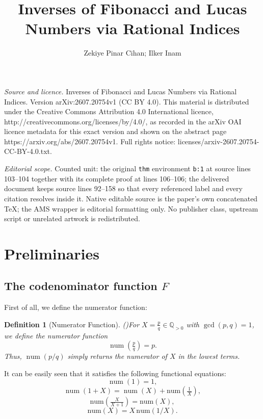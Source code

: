 \documentclass[10pt,a4paper]{amsart}
\numberwithin{equation}{section}
\numberwithin{table}{section}
\numberwithin{figure}{section}
\DeclareMathOperator{\num}{num}
\newtheorem{definition}[thm]{Definition}
\begin{document}
\title[Inverses of Fibonacci and Lucas Numbers via Rational Indices]{Inverses of Fibonacci and Lucas Numbers via Rational Indices}
\author{Zekiye Pinar Cihan; Ilker Inam}
\date{}
\maketitle
\noindent\emph{Source and licence.} Inverses of Fibonacci and Lucas Numbers via Rational Indices. Version arXiv:2607.20754v1 (CC BY 4.0). This material is distributed under the Creative Commons Attribution 4.0 International licence, http://creativecommons.org/licenses/by/4.0/, as recorded in the arXiv OAI licence metadata for this exact version and shown on the abstract page https://arxiv.org/abs/2607.20754v1. Full rights notice: licenses/arxiv-2607.20754-CC-BY-4.0.txt.\par\smallskip
\noindent\textit{Editorial scope.} Counted unit: the original \texttt{thm} environment \texttt{b:1} at source lines 103--104 together with its complete proof at lines 106--106; the delivered document keeps source lines 92--158 so that every referenced label and every citation resolves inside it. Native editable source is the paper's own concatenated TeX; the AMS wrapper is editorial formatting only. No publisher class, upstream script or unrelated artwork is redistributed.
\section{Preliminaries}\label{sec:1}\subsection{The codenominator function $F$}First of all, we define the numerator function:
\begin{definition}[Numerator Function] {\normalfont(\cite{ULUDAG2022103192})}For $X = \tfrac{p}{q}\in\mathbb{Q}_{>0}$ with $\gcd (p, q) = 1$, we define the \emph{numerator function}	\begin{equation*}		\num\!\left(\tfrac{p}{q}\right) = p.	\end{equation*}	Thus, $\num(p/q)$ simply returns the numerator of $X$ in the lowest terms.\end{definition}



It can be easily seen that it satisfies the following functional equations:\begin{equation}	\num(1) = 1,\end{equation}\begin{equation}\num(1+X) =\num(X) + \mathrm{num}\!\left(\tfrac{1}{X}\right),\end{equation}\begin{equation}	\mathrm{num}\!\left(\tfrac{X}{X+1}\right) =\mathrm{num}(X),\end{equation}\begin{equation}	\mathrm{num}(X) = X \, \mathrm{num}(1/X).\end{equation}
\end{document}

